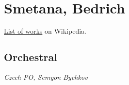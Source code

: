 \chapter{Smetana, Bedrich}
\label{cha:smetana}

\href{https://en.wikipedia.org/wiki/List_of_compositions_by_Bedřich_Smetana}{List of works} on Wikipedia.

\section{Orchestral}

  \textit{Czech PO, Semyon Bychkov} 


